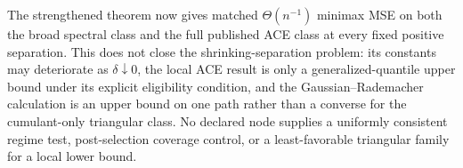 The strengthened theorem now gives matched \(\Theta(n^{-1})\) minimax MSE on both the broad spectral class and the full published ACE class at every fixed positive separation. This does not close the shrinking-separation problem: its constants may deteriorate as \(\delta\downarrow0\), the local ACE result is only a generalized-quantile upper bound under its explicit eligibility condition, and the Gaussian--Rademacher calculation is an upper bound on one path rather than a converse for the cumulant-only triangular class. No declared node supplies a uniformly consistent regime test, post-selection coverage control, or a least-favorable triangular family for a local lower bound.